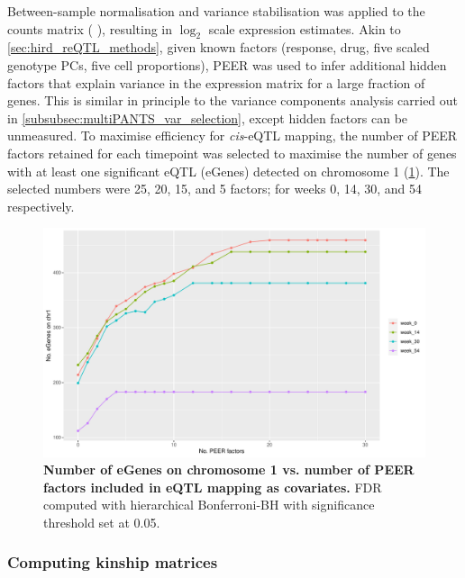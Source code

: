 Between-sample normalisation and variance stabilisation was applied to the counts matrix ( \autocite{love2014ModeratedEstimationFold}), resulting in $\log_2$ scale expression estimates.
Akin to \cref{sec:hird_reQTL_methods},
given known factors (response, drug, five scaled genotype \glspl{PC}, five cell proportions), 
{PEER} \autocite{stegle2012UsingProbabilisticEstimation} was used to infer additional hidden factors that explain variance in the expression matrix for a large fraction of genes.
This is similar in principle to the variance components analysis carried out in \cref{subsubsec:multiPANTS_var_selection}, except hidden factors can be unmeasured.
To maximise efficiency for \textit{cis}-\gls{eQTL} mapping, 
the number of PEER factors retained for each timepoint was selected to maximise the number of genes with at least one significant \gls{eQTL} (eGenes) detected on chromosome 1 (\cref{fig:multipants_reqtl_PEER_k_choice}).
The selected numbers were 25, 20, 15, and 5 factors; for weeks 0, 14, 30, and 54 respectively.

\begin{figure}
    \centering
    \includegraphics[width=1.0\textwidth,page=1]{mainmatter/figures/chapter_04/count_eGenes.signif_eGenes_vs_PEER_n.dataset_multiPANTS.chr_1.pdf}
    \caption{
        \textbf{Number of eGenes on chromosome 1 vs. number of PEER factors included in \gls{eQTL} mapping as covariates.}
        \gls{FDR} computed with hierarchical Bonferroni-\gls{BH} \autocite{huang2018PowerFalseDiscovery} with significance threshold set at 0.05.
    }
    \label{fig:multipants_reqtl_PEER_k_choice}
\end{figure}

\subsubsection{Computing kinship matrices}

